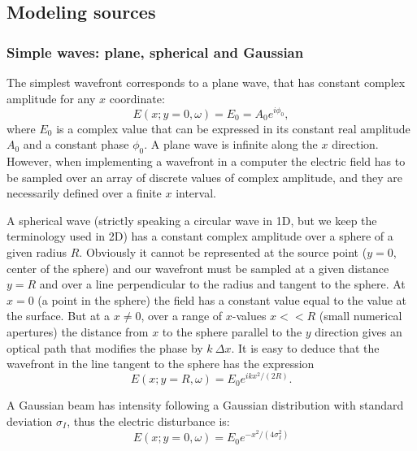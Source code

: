 \documentclass{iucr}              %
\begin{document}
\subsection{Modeling sources}
\label{sec:sources}

\subsubsection{Simple waves: plane, spherical and Gaussian}

The simplest wavefront corresponds to a plane wave, that has constant complex amplitude for any $x$ coordinate: 
\begin{equation}
   E(x;y=0,\omega)=E_0=A_0 e^{i \phi_0},
\end{equation}
where $E_0$ is a complex value that can be expressed in its constant real  amplitude $A_0$ and a constant phase $\phi_0$. A plane wave is infinite along the $x$ direction. However, when implementing a wavefront in a computer the electric field has to be sampled over an array of discrete values of complex amplitude, and they are necessarily defined over a finite $x$ interval. 

A spherical wave (strictly speaking a circular wave in 1D, but we keep the terminology used in 2D) has a constant complex amplitude over a sphere of a given radius $R$. Obviously it cannot be represented at the source point ($y=0$, center of the sphere) and our wavefront must be sampled at a given distance $y=R$ and over a line perpendicular to the radius and tangent to the sphere. At $x=0$ (a point in the sphere) the field has a constant value equal to the value at the surface. But at a $x\ne$0, over a range of $x$-values $x<<R$ (small numerical apertures) the distance from $x$ to the sphere parallel to the $y$ direction gives an optical path that modifies the phase by $k ~\Delta x$. It is easy to deduce that the wavefront in the line tangent to the sphere has the expression
\begin{equation}
\label{eq:sphericalWave}
    E(x;y=R,\omega)  = E_0 e^{i k x^2 / (2 R)}.
\end{equation}



A Gaussian beam has intensity following a Gaussian distribution with standard deviation $\sigma_I$, thus the electric disturbance is: 
\begin{equation}
\label{eq:gaussianSource}
    E(x;y=0,\omega) = E_0 e^{-x^2 / (4 \sigma_I^2)}
\end{equation}
\end{document}
